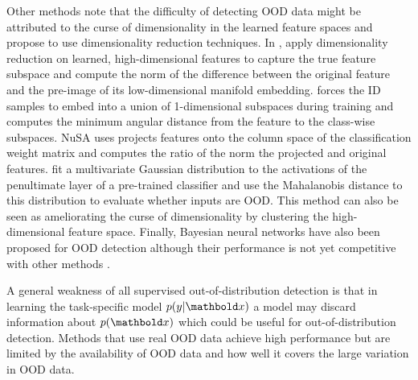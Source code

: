 Other methods note that the difficulty of detecting OOD data might be attributed to the curse of dimensionality in the learned feature spaces and propose to use dimensionality reduction techniques. In \textcite{ndiour_outofdistribution_2020}, apply dimensionality reduction on learned, high-dimensional features to capture the true feature subspace and compute the norm of the difference between the original feature and the pre-image of its low-dimensional manifold embedding. 
\textcite{zaeemzadeh_outofdistribution_2021} forces the ID samples to embed into a union of 1-dimensional subspaces during training and computes the minimum angular distance from the feature to the class-wise subspaces. 
NuSA \parencite{cook_outlier_2020} uses projects features onto the column space of the classification weight matrix and computes the ratio of the norm the projected and original features.
\textcite{lee_simple_2018} fit a multivariate Gaussian distribution to the activations of the penultimate layer of a pre-trained classifier and use the Mahalanobis distance to this distribution to evaluate whether inputs are OOD. This method can also be seen as ameliorating the curse of dimensionality by clustering the high-dimensional feature space. 
Finally, Bayesian neural networks have also been proposed for OOD detection although their performance is not yet competitive with other methods \parencite{henning_are_2021,dangelo_outofdistribution_2022,nguyen_out_2022}. 

A general weakness of all supervised out-of-distribution detection is that in learning the task-specific model $p(y|\xb)$ a model may discard information about $p(\xb)$ which could be useful for out-of-distribution detection.
Methods that use real OOD data achieve high performance but are limited by the availability of OOD data and how well it covers the large variation in OOD data.




